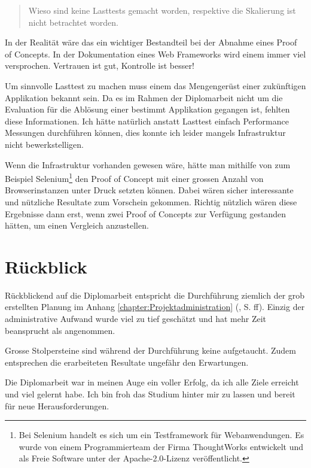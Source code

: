 \begin{quote}\begin{itshape}Wieso sind keine Lasttests gemacht worden,
respektive die Skalierung ist nicht betrachtet worden.\end{itshape}\end{quote}

In der Realität wäre das ein wichtiger Bestandteil bei der Abnahme eines Proof
of Concepts. In der Dokumentation eines Web Frameworks wird einem immer viel
versprochen. Vertrauen ist gut, Kontrolle ist besser! 

Um sinnvolle Lasttest zu machen muss einem das Mengengerüst einer zukünftigen
Applikation bekannt sein. Da es im Rahmen der Diplomarbeit nicht um die
Evaluation für die Ablösung einer bestimmt Applikation gegangen ist, fehlten
diese Informationen. Ich hätte natürlich anstatt Lasttest einfach Performance
Messungen durchführen können, dies konnte ich leider mangels Infrastruktur nicht
bewerkstelligen.

Wenn die Infrastruktur vorhanden gewesen wäre, hätte man mithilfe von
zum Beispiel Selenium\footnote{Bei Selenium handelt es sich um ein
Testframework für Webanwendungen. Es wurde von einem Programmierteam der
Firma ThoughtWorks entwickelt und als Freie Software unter der
Apache-2.0-Lizenz veröffentlicht.} den Proof of Concept mit einer grossen Anzahl
von Browserinstanzen unter Druck setzten können. Dabei wären sicher interessante
und nützliche Resultate zum Vorschein gekommen. Richtig nützlich wären diese
Ergebnisse dann erst, wenn zwei Proof of Concepts zur Verfügung gestanden
hätten, um einen Vergleich anzustellen.

\section{Rückblick}

Rückblickend auf die Diplomarbeit entspricht die Durchführung ziemlich der
grob erstellten Planung im Anhang \ref{chapter:Projektadministration}
(, S.
\pageref{chapter:Projektadministration}ff). Einzig der administrative Aufwand
wurde viel zu tief geschätzt und hat mehr Zeit beansprucht als angenommen.

Grosse Stolpersteine sind während der Durchführung keine aufgetaucht. Zudem
entsprechen die erarbeiteten Resultate ungefähr den Erwartungen.

Die Diplomarbeit war in meinen Auge ein voller Erfolg, da ich alle Ziele
erreicht und viel gelernt habe. Ich bin froh das Studium hinter mir zu lassen
und bereit für neue Herausforderungen.

